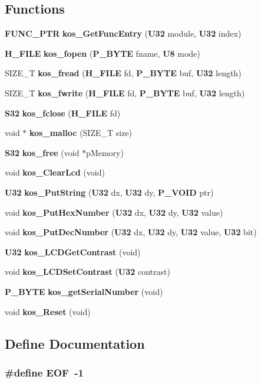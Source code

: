 \subsection*{Functions}
\begin{CompactItemize}
\item 
{\bf FUNC\_\-PTR} {\bf kos\_\-Get\-Func\-Entry} ({\bf U32} module, {\bf U32} index)
\item 
{\bf H\_\-FILE} {\bf kos\_\-fopen} ({\bf P\_\-BYTE} fname, {\bf U8} mode)
\item 
SIZE\_\-T {\bf kos\_\-fread} ({\bf H\_\-FILE} fd, {\bf P\_\-BYTE} buf, {\bf U32} length)
\item 
SIZE\_\-T {\bf kos\_\-fwrite} ({\bf H\_\-FILE} fd, {\bf P\_\-BYTE} buf, {\bf U32} length)
\item 
{\bf S32} {\bf kos\_\-fclose} ({\bf H\_\-FILE} fd)
\item 
void $\ast$ {\bf kos\_\-malloc} (SIZE\_\-T size)
\item 
{\bf S32} {\bf kos\_\-free} (void $\ast$p\-Memory)
\item 
void {\bf kos\_\-Clear\-Lcd} (void)
\item 
{\bf U32} {\bf kos\_\-Put\-String} ({\bf U32} dx, {\bf U32} dy, {\bf P\_\-VOID} ptr)
\item 
void {\bf kos\_\-Put\-Hex\-Number} ({\bf U32} dx, {\bf U32} dy, {\bf U32} value)
\item 
void {\bf kos\_\-Put\-Dec\-Number} ({\bf U32} dx, {\bf U32} dy, {\bf U32} value, {\bf U32} bit)
\item 
{\bf U32} {\bf kos\_\-LCDGet\-Contrast} (void)
\item 
void {\bf kos\_\-LCDSet\-Contrast} ({\bf U32} contrast)
\item 
{\bf P\_\-BYTE} {\bf kos\_\-get\-Serial\-Number} (void)
\item 
void {\bf kos\_\-Reset} (void)
\end{CompactItemize}


\subsection{Define Documentation}
\subsubsection{\setlength{\rightskip}{0pt plus 5cm}\#define EOF\ -1}\label{kos_8h_a40}




